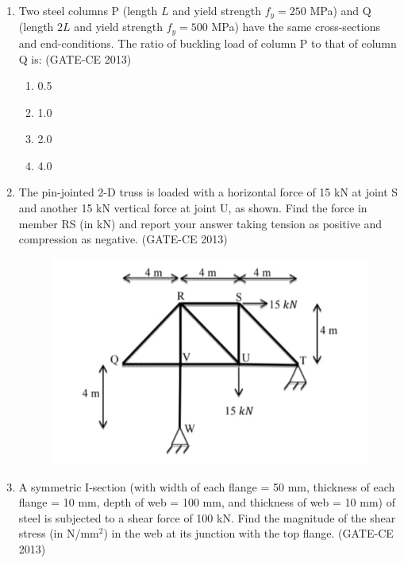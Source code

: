 \documentclass[journal,12pt,onecolumn]{article}
\theoremstyle{remark}
\begin{document}
\begin{enumerate}
    \item Two steel columns P (length $L$ and yield strength $f_y = 250$ MPa) and Q (length $2L$ and yield strength $f_y = 500$ MPa) have the same cross-sections and end-conditions. The ratio of buckling load of column P to that of column Q is: (GATE-CE 2013)
    \begin{multicols}{4}
    \begin{enumerate}
        \item 0.5 
        \item 1.0 
        \item 2.0 
        \item 4.0
    \end{enumerate}
    \end{multicols}
    
    \item The pin-jointed 2-D truss is loaded with a horizontal force of 15 kN at joint S and another 15 kN vertical force at joint U, as shown. Find the force in member RS (in kN) and report your answer taking tension as positive and compression as negative. \underline{\hspace{3cm}} (GATE-CE 2013)
    
    \begin{figure}[H]
    \centering
    \includegraphics[width=0.7\columnwidth]{figs/image10.jpg}  
    \caption{}
    \label{fig:1}
    \end{figure}
    
    \item A symmetric I-section (with width of each flange = 50 mm, thickness of each flange = 10 mm, depth of web = 100 mm, and thickness of web = 10 mm) of steel is subjected to a shear force of 100 kN. Find the magnitude of the shear stress (in N/mm$^2$) in the web at its junction with the top flange. \underline{\hspace{3cm}} (GATE-CE 2013)
    

\end{enumerate}
\end{document}
